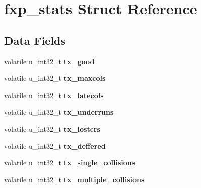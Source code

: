 \hypertarget{structfxp__stats}{}\section{fxp\+\_\+stats Struct Reference}
\label{structfxp__stats}
\subsection*{Data Fields}
\begin{DoxyCompactItemize}
\item 
\mbox{\label{structfxp__stats_a3cd1c68dae651c3e8d78adc3e8d8f4f1}} 
volatile u\+\_\+int32\+\_\+t {\bfseries tx\+\_\+good}
\item 
\mbox{\label{structfxp__stats_a3c46d5de78f80763109e19fe4273df1f}} 
volatile u\+\_\+int32\+\_\+t {\bfseries tx\+\_\+maxcols}
\item 
\mbox{\label{structfxp__stats_a85cccdbf0a9ec4de28fedbc430ae42af}} 
volatile u\+\_\+int32\+\_\+t {\bfseries tx\+\_\+latecols}
\item 
\mbox{\label{structfxp__stats_a41ba0b023fa9481c41940073058213a8}} 
volatile u\+\_\+int32\+\_\+t {\bfseries tx\+\_\+underruns}
\item 
\mbox{\label{structfxp__stats_a50ad52eecf6421155effdf633d7928e4}} 
volatile u\+\_\+int32\+\_\+t {\bfseries tx\+\_\+lostcrs}
\item 
\mbox{\label{structfxp__stats_aa64971ca43a96845bd63b146a9fa3cfc}} 
volatile u\+\_\+int32\+\_\+t {\bfseries tx\+\_\+deffered}
\item 
\mbox{\label{structfxp__stats_a2e32fcb5130ec03d77ea685cb087fdc7}} 
volatile u\+\_\+int32\+\_\+t {\bfseries tx\+\_\+single\+\_\+collisions}
\item 
\mbox{\label{structfxp__stats_a03e372bd8e6a0b03a682a86aea0dc34e}} 
volatile u\+\_\+int32\+\_\+t {\bfseries tx\+\_\+multiple\+\_\+collisions}
\item 
\mbox{\label{structfxp__stats_a152ef2b35703eadee5d589191068e4b2}} 

\end{DoxyCompactItemize}
